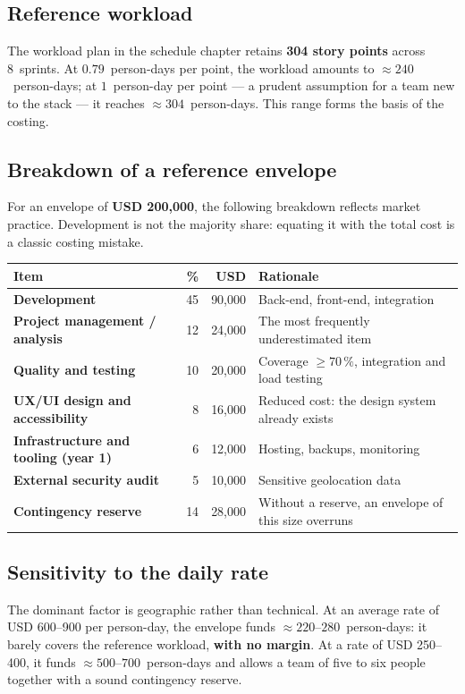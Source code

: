 \subsection{Reference workload}
The workload plan in the schedule chapter retains \textbf{304 story points}
across 8~sprints. At $0.79$~person-days per point, the workload amounts to
$\approx 240$~person-days; at $1$~person-day per point --- a prudent assumption
for a team new to the stack --- it reaches $\approx 304$~person-days. This range
forms the basis of the costing.

\subsection{Breakdown of a reference envelope}
For an envelope of \textbf{USD 200,000}, the following breakdown reflects market
practice. Development is not the majority share: equating it with the total cost
is a classic costing mistake.

\begin{xltabular}{\textwidth}{>{\bfseries}p{5.2cm} r r X}
\toprule
\textbf{Item} & \textbf{\%} & \textbf{USD} & \textbf{Rationale} \\
\midrule
\endhead
Development & 45 & 90,000 & Back-end, front-end, integration \\
Project management / analysis & 12 & 24,000 & The most frequently underestimated item \\
Quality and testing & 10 & 20,000 & Coverage $\geq 70\,\%$, integration and load testing \\
UX/UI design and accessibility & 8 & 16,000 & Reduced cost: the design system already exists \\
Infrastructure and tooling (year 1) & 6 & 12,000 & Hosting, backups, monitoring \\
External security audit & 5 & 10,000 & Sensitive geolocation data \\
Contingency reserve & 14 & 28,000 & Without a reserve, an envelope of this size overruns \\
\bottomrule
\end{xltabular}

\subsection{Sensitivity to the daily rate}
The dominant factor is geographic rather than technical. At an average rate of
USD 600--900 per person-day, the envelope funds $\approx 220$--$280$~person-days:
it barely covers the reference workload, \textbf{with no margin}. At a rate of
USD 250--400, it funds $\approx 500$--$700$~person-days and allows a team of five
to six people together with a sound contingency reserve.

